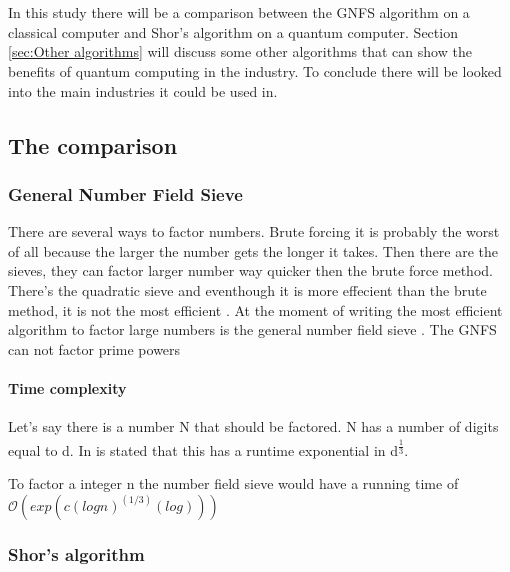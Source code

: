 
\chapter{}
\label{ch:onderzoek}



In this study there will be a comparison between the GNFS algorithm on a classical computer and Shor's algorithm on a quantum computer.
Section \ref{sec:Other algorithms} will discuss some other algorithms that can show the benefits of quantum computing in the industry. To conclude there will be looked into the main industries it could be used in.

\section{The comparison}
\subsection{General Number Field Sieve}
There are several ways to factor numbers. Brute forcing it is probably the worst of all because the larger the number gets the longer it takes. Then there are the sieves, they can factor larger number way quicker then the brute force method.
There's the quadratic sieve and eventhough it is more effecient than the brute method, it is not the most efficient \autocite{Quadratic_sieve}. At the moment of writing the most efficient algorithm to factor large numbers is the general number field sieve \autocite{shor_algo}.
The GNFS can not factor prime powers
\subsubsection{Time complexity}
Let's say there is a number N that should be factored. N has a number of digits equal to d. In \textcite{shor_algo} is stated that this has a runtime exponential in d\textsuperscript{$\frac{1}{3}$}.

To factor a integer n the number field sieve would have a running time of $\mathcal{O}(exp(c(log n)^(1/3)(log)))$
\subsection{Shor's algorithm}
